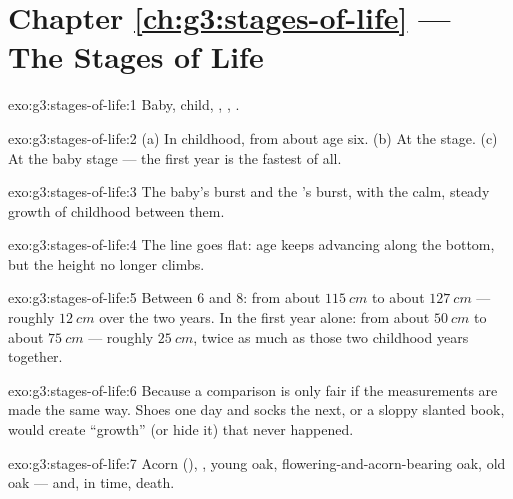 \section*{Chapter \ref{ch:g3:stages-of-life} --- The Stages of Life}

\begin{solution}{exo:g3:stages-of-life:1}
Baby, child, , , .
\end{solution}

\begin{solution}{exo:g3:stages-of-life:2}
(a) In childhood, from about age six. (b) At the  stage.
(c) At the baby stage --- the first year is the fastest of all.
\end{solution}

\begin{solution}{exo:g3:stages-of-life:3}
The baby's burst and the 's burst, with the calm,
steady growth of childhood between them.
\end{solution}

\begin{solution}{exo:g3:stages-of-life:4}
The line goes flat: age keeps advancing along the bottom, but
the height no longer climbs.
\end{solution}

\begin{solution}{exo:g3:stages-of-life:5}
Between $6$ and $8$: from about $\qty{115}{cm}$ to about
$\qty{127}{cm}$ --- roughly $\qty{12}{cm}$ over the two years.
In the first year alone: from about $\qty{50}{cm}$ to about
$\qty{75}{cm}$ --- roughly $\qty{25}{cm}$, twice as much as
those two childhood years together.
\end{solution}

\begin{solution}{exo:g3:stages-of-life:6}
Because a comparison is only fair if the measurements are made
the same way. Shoes one day and socks the next, or a sloppy
slanted book, would create ``growth'' (or hide it) that never
happened.
\end{solution}

\begin{solution}{exo:g3:stages-of-life:7}
Acorn (), , young oak,  flowering-and-acorn-bearing
oak, old oak --- and, in time, death.
\end{solution}

